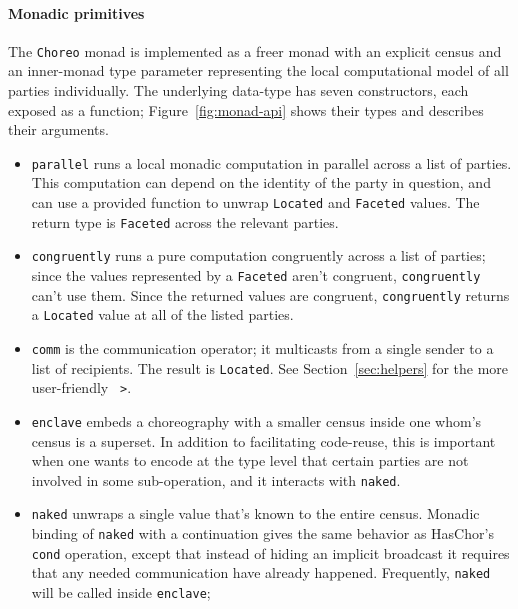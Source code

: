 \documentclass[sigplan,screen,review,anonymous]{acmart}
\newcommand{\HasChor}{Has\-Chor\xspace}
\newcommand{\inlinecode}[2][haskell]{\texttt{#2}}
\begin{document}
\paragraph{Monadic primitives}
The \inlinecode{Choreo} monad is implemented as a freer monad with an explicit census
and an inner-monad type parameter representing
the local computational model of all parties individually.
The underlying data-type has seven constructors, each exposed as a function;
Figure~\ref{fig:monad-api} shows their types and describes their arguments.
\begin{itemize}[leftmargin=12pt, topsep=2pt]
    \item \inlinecode{parallel} runs a local monadic computation in parallel across a list of parties.
          This computation can depend on the identity of the party in question,
          and can use a provided function to unwrap \inlinecode{Located} and \inlinecode{Faceted}
          values.
          The return type is \inlinecode{Faceted} across the relevant parties.
    \item \inlinecode{congruently} runs a pure computation congruently across a list of parties;
          since the values represented by a \inlinecode{Faceted} aren't congruent,
          \inlinecode{congruently} can't use them.
          Since the returned values are congruent,
          \inlinecode{congruently} returns a \inlinecode{Located} value at all of the listed parties.
    \item \inlinecode{comm} is the communication operator;
          it multicasts from a single sender to a list of recipients.
          The result is \inlinecode{Located}.
          See Section~\ref{sec:helpers} for the more user-friendly \inlinecode{~>}.
    \item \inlinecode{enclave} embeds a choreography with a smaller census inside one whom's
          census is a superset.
          In addition to facilitating code-reuse, this is important when one wants to encode
          at the type level that certain parties are not involved in some sub-operation,
          and it interacts with \inlinecode{naked}.
    \item \inlinecode{naked} unwraps a single value that's known to the entire census.
          Monadic binding of \inlinecode{naked} with a continuation gives the same behavior
          as \HasChor's \inlinecode{cond} operation, except that instead of hiding an implicit
          broadcast it requires that any needed communication have already happened.
          Frequently, \inlinecode{naked} will be called inside \inlinecode{enclave};

\end{itemize}
\end{document}

